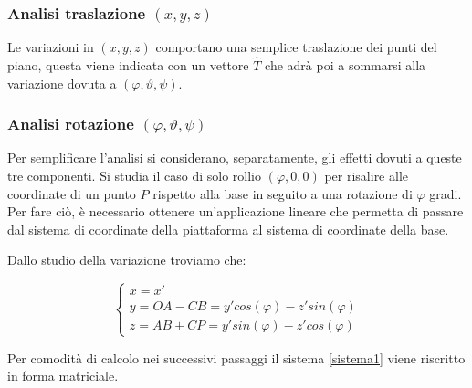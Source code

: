 \documentclass[11pt]{article}
\begin{document}
\subsubsection{Analisi traslazione $(x,y,z)$}\label{xyz}
Le variazioni in $(x,y,z)$ comportano una semplice traslazione dei punti del piano, questa viene indicata con un vettore $\hat T$ che adrà poi a sommarsi alla variazione dovuta a $(\varphi,\vartheta,\psi)$.

\subsubsection{Analisi rotazione $(\varphi,\vartheta,\psi)$}\label{ftp}
Per semplificare l'analisi si considerano, separatamente, gli effetti dovuti a queste tre componenti. Si studia il caso di solo rollio $(\varphi,0,0)$ per risalire alle coordinate di un punto $P$ rispetto alla base in seguito a una rotazione di $\varphi$ gradi. Per fare ciò, è necessario ottenere un'applicazione lineare che permetta di passare dal sistema di coordinate della piattaforma al sistema di coordinate della base.


Dallo studio della variazione troviamo che:

\begin{equation}\label{sistema1}
\begin{cases} 
x=x' \\ 
y=OA-CB=y'cos(\varphi)-z'sin(\varphi) \\ 
z=AB+CP=y'sin(\varphi)-z'cos(\varphi)
\end{cases} 
\end{equation}


Per comodità di calcolo nei successivi passaggi il sistema \eqref{sistema1} viene riscritto in forma matriciale.
\end{document}

